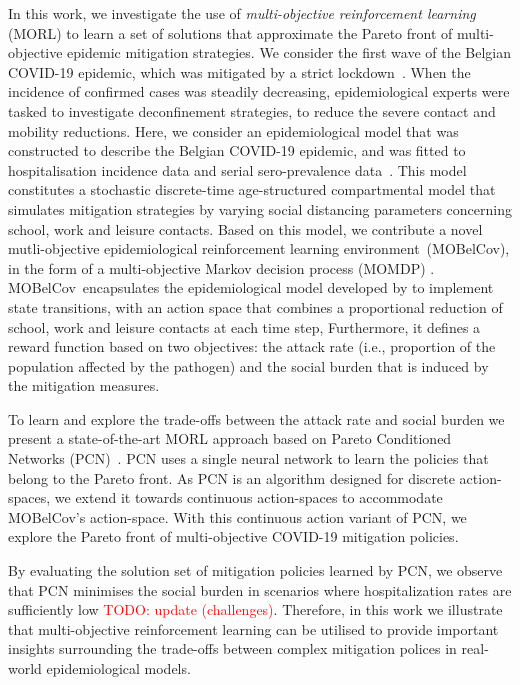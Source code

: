 \documentclass{article}
\renewcommand{\cite}[1]{\citep{#1}}
\newcommand\todo[1]{\textcolor{red}{TODO: #1}}
\newcommand{\momdpname}{MOBelCov}
\begin{document}
In this work, we investigate the use of \emph{multi-objective reinforcement learning} (MORL) to learn a set of solutions that approximate the Pareto front of multi-objective epidemic mitigation strategies. We consider the first wave of the Belgian COVID-19 epidemic, which was mitigated by a strict lockdown~\cite{willem2021impact}. When the incidence of confirmed cases was steadily decreasing, epidemiological experts were tasked to investigate deconfinement strategies, to reduce the severe contact and mobility reductions.
Here, we consider an epidemiological model that was constructed to describe the Belgian COVID-19 epidemic, and was fitted to hospitalisation incidence data and serial sero-prevalence data~\citet{abrams2021modelling}.
This model constitutes a stochastic discrete-time age-structured compartmental model that simulates mitigation strategies by varying social distancing parameters concerning school, work and leisure contacts.  
Based on this model, we contribute a novel mutli-objective epidemiological reinforcement learning environment~(\momdpname), in the form of a multi-objective Markov decision process (MOMDP) \cite{roijers2013survey}. \momdpname\ encapsulates the epidemiological model developed by \citet{abrams2021modelling} to implement state transitions, with an action space that combines a proportional reduction of school, work and leisure contacts at each time step, Furthermore, it defines a reward function based on two objectives: the attack rate (i.e., proportion of the population affected by the pathogen) and the social burden that is induced by the mitigation measures.

To learn and explore the trade-offs between the attack rate and social burden we present a state-of-the-art MORL approach based on Pareto Conditioned Networks (PCN)~\cite{reymond2022pcn}. PCN uses a single neural network to learn the policies that belong to the Pareto front.
As PCN is an algorithm designed for discrete action-spaces, we extend it towards continuous action-spaces to accommodate \momdpname's action-space. With this continuous action variant of PCN, we explore the Pareto front of multi-objective COVID-19 mitigation policies.  

By evaluating the solution set of mitigation policies learned by PCN, we observe that PCN minimises the social burden in scenarios where hospitalization rates are sufficiently low \todo{update (challenges)}. Therefore, in this work we illustrate that multi-objective reinforcement learning can be utilised to provide important insights surrounding the trade-offs between complex mitigation polices in real-world epidemiological models.
\end{document}
